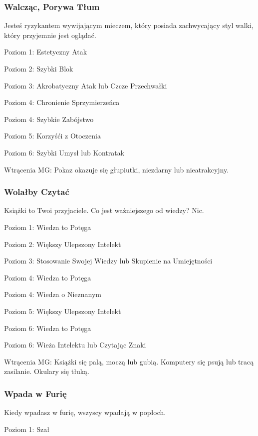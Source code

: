 \subsubsection{Walcząc, Porywa Tłum}

Jesteś ryzykantem wywijającym mieczem, który posiada zachwycający styl walki, który przyjemnie jest oglądać. 

Poziom 1: Estetyczny Atak

Poziom 2: Szybki Blok

Poziom 3: Akrobatyczny Atak lub Czcze Przechwałki

Poziom 4: Chronienie Sprzymierzeńca

Poziom 4: Szybkie Zabójstwo

Poziom 5: Korzyśći z Otoczenia

Poziom 6: Szybki Umysł lub Kontratak

Wtrącenia MG: Pokaz okazuje się głupiutki, niezdarny lub nieatrakcyjny. 

\subsubsection{Wolałby Czytać}

Książki to Twoi przyjaciele. Co jest ważniejszego od wiedzy? Nic. 

Poziom 1: Wiedza to Potęga

Poziom 2: Większy Ulepszony Intelekt

Poziom 3: Stosowanie Swojej Wiedzy lub Skupienie na Umiejętności

Poziom 4: Wiedza to Potęga

Poziom 4: Wiedza o Nieznanym

Poziom 5: Większy Ulepszony Intelekt

Poziom 6: Wiedza to Potęga

Poziom 6: Wieża Intelektu lub Czytając Znaki

Wtrącenia MG: Książki się palą, moczą lub gubią. Komputery się psują lub tracą zasilanie. Okulary się tłuką.

\subsubsection{Wpada w Furię}

Kiedy wpadasz w furię, wszyscy wpadają w popłoch.

Poziom 1: Szał

